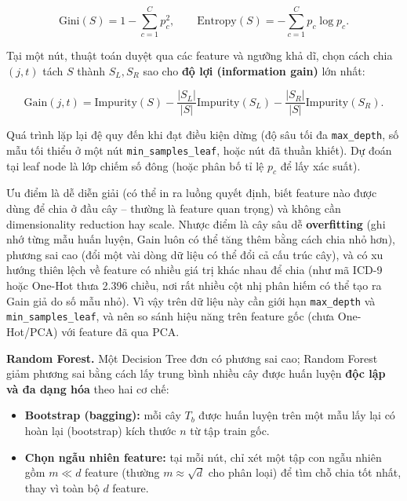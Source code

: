 \documentclass[a4paper]{report}
\begin{document}
\begin{equation}
  \text{Gini}(S) = 1 - \sum_{c=1}^{C} p_c^2, \qquad \text{Entropy}(S) = -\sum_{c=1}^{C} p_c \log p_c.
\end{equation}

Tại một nút, thuật toán duyệt qua các feature và ngưỡng khả dĩ, chọn cách chia $(j, t)$ tách $S$ thành $S_L, S_R$ sao cho \textbf{độ lợi (information gain)} lớn nhất:

\begin{equation}
  \text{Gain}(j, t) = \text{Impurity}(S) - \frac{|S_L|}{|S|}\text{Impurity}(S_L) - \frac{|S_R|}{|S|}\text{Impurity}(S_R).
\end{equation}

Quá trình lặp lại đệ quy đến khi đạt điều kiện dừng (độ sâu tối đa \texttt{max\_\allowbreak{}depth}, số mẫu tối thiểu ở một nút \texttt{min\_\allowbreak{}samples\_\allowbreak{}leaf}, hoặc nút đã thuần khiết). Dự đoán tại leaf node là lớp chiếm số đông (hoặc phân bố tỉ lệ $p_c$ để lấy xác suất).

Ưu điểm là dễ diễn giải (có thể in ra luồng quyết định, biết feature nào được dùng để chia ở đầu cây – thường là feature quan trọng) và không cần dimensionality reduction hay scale. Nhược điểm là cây sâu dễ \textbf{overfitting} (ghi nhớ từng mẫu huấn luyện, Gain luôn có thể tăng thêm bằng cách chia nhỏ hơn), phương sai cao (đổi một vài dòng dữ liệu có thể đổi cả cấu trúc cây), và có xu hướng thiên lệch về feature có nhiều giá trị khác nhau để chia (như mã ICD-9 hoặc One-Hot thưa 2.396 chiều, nơi rất nhiều cột nhị phân hiếm có thể tạo ra Gain giả do số mẫu nhỏ). Vì vậy trên dữ liệu này cần giới hạn \texttt{max\_\allowbreak{}depth} và \texttt{min\_\allowbreak{}samples\_\allowbreak{}leaf}, và nên so sánh hiệu năng trên feature gốc (chưa One-Hot/PCA) với feature đã qua PCA.

\textbf{Random Forest.} Một Decision Tree đơn có phương sai cao; Random Forest giảm phương sai bằng cách lấy trung bình nhiều cây được huấn luyện \textbf{độc lập và đa dạng hóa} theo hai cơ chế:

\begin{itemize}
  \item \textbf{Bootstrap (bagging):} mỗi cây $T_b$ được huấn luyện trên một mẫu lấy lại có hoàn lại (bootstrap) kích thước $n$ từ tập train gốc.
  \item \textbf{Chọn ngẫu nhiên feature:} tại mỗi nút, chỉ xét một tập con ngẫu nhiên gồm $m \ll d$ feature (thường $m \approx \sqrt{d}$ cho phân loại) để tìm chỗ chia tốt nhất, thay vì toàn bộ $d$ feature.
\end{itemize}
\end{document}

